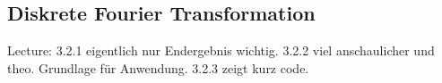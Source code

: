 \subsection{Diskrete Fourier Transformation}

Lecture: 3.2.1 eigentlich nur Endergebnis wichtig. 3.2.2 viel anschaulicher und theo. Grundlage für Anwendung. 3.2.3 zeigt kurz code.

